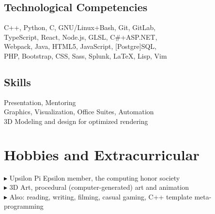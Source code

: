 \documentclass[Letterpaper,11pt]{article}
\newcommand{\bul}{$\blacktriangleright$ }
\begin{document}
\begin{multicols}{2}

    \subsection*{Technological Competencies}

        C++, Python, C, GNU/Linux+Bash, Git, GitLab, \\
        TypeScript, React, Node.js, GLSL, C\#+ASP.NET, \\
        Webpack, Java, HTML5, JavaScript, [Postgre]SQL, \\ 
        PHP, Bootstrap, CSS, Sass, Splunk, \LaTeX, Lisp, Vim \\

    \subsection*{Skills}

        Presentation, Mentoring\\
        Graphics, Visualization, Office Suites, Automation\\
        3D Modeling and design for optimized rendering

\end{multicols}

\section*{Hobbies and Extracurricular}

    \bul Upsilon Pi Epsilon member, the computing honor society\\
    \bul 3D Art, procedural (computer-generated) art and animation\\
    \bul Also: reading, writing, filming, casual gaming, C++ template meta-programming

\clearpage
\end{document}
